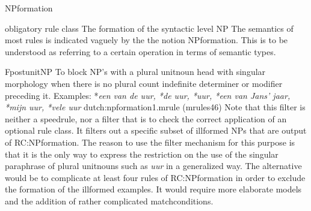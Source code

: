 \begin{mruleclass}{NPformation}
\begin{classdescr}
\kind obligatory rule class
\classtask The formation of the syntactic level NP
\classremarks The semantics of most rules is indicated vaguely by the 
the notion NPformation. This is to be understood as referring to a 
certain operation in terms of semantic types. 
\begin{filters}
\item 
\begin{member}
 FpostunitNP
 To block NP's with a plural unitnoun head 
with singular morphology
when there is no plural 
count indefinite determiner or modifier preceding it.
Examples: *{\em een van de uur, *de uur, *uur, 
*een van Jans' jaar, *mijn uur, *vele uur}
\file dutch:npformation1.mrule (mrules46)
\remarks
Note that this filter is neither a speedrule, nor a filter that is to
check the correct application of an optional rule class. 
It filters out a specific subset of illformed NPs that are 
output of RC:NPformation. 
The reason to use the filter mechanism for this purpose is that 
it is the only way to express the restriction on the use of the singular 
paraphrase of plural unitnouns such as {\em uur} in a generalized way.
The alternative would be to complicate at least four rules of RC:NPformation
in order to exclude the formation of the illformed examples. 
It would require more elaborate models and the addition of 
rather complicated matchconditions. \\
\end{member}

\end{filters}

\nospeedrules
\noplannedrules
\norulesnotince
\begin{comments}
\end{comments}

\end{classdescr}


\end{mruleclass}
